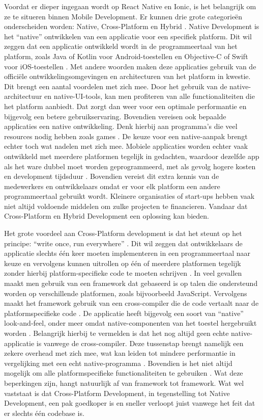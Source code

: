 Voordat er dieper ingegaan wordt op React Native en Ionic, is het belangrijk om ze te situeren binnen Mobile Development. Er kunnen drie grote categorieën onderscheiden worden: Native, Cross-Platform en Hybrid \autocite{Bron12}. Native Development is het ``native'' ontwikkelen van een applicatie voor een specifiek platform. Dit wil zeggen dat een applicatie ontwikkeld wordt in de programmeertaal van het platform, zoals Java of Kotlin voor Android-toestellen en Objective-C of Swift voor iOS-toestellen \autocite{Bron1, Bron11}. Met andere woorden maken deze applicaties gebruik van de officiële ontwikkelingsomgevingen en architecturen van het platform in kwestie. Dit brengt een aantal voordelen met zich mee. Door het gebruik van de native-architectuur en native-UI-tools, kan men profiteren van alle functionaliteiten die het platform aanbiedt. Dat zorgt dan weer voor een optimale performantie en bijgevolg een betere gebruikservaring. Bovendien vereisen ook bepaalde applicaties een native ontwikkeling. Denk hierbij aan programma's die veel resources nodig hebben zoals games \autocite{Bron12}. De keuze voor een native-aanpak brengt echter toch wat nadelen met zich mee. Mobiele applicaties worden echter vaak ontwikkeld met meerdere platformen tegelijk in gedachten, waardoor dezelfde app als het ware dubbel moet worden geprogrammeerd, met als gevolg hogere kosten en development tijdsduur \autocite{Bron12}. Bovendien vereist dit extra kennis van de medewerkers en ontwikkelaars omdat er voor elk platform een andere programmeertaal gebruikt wordt. Kleinere organisaties of start-ups hebben vaak niet altijd voldoende middelen om zulke projecten te financieren. Vandaar dat Cross-Platform en Hybrid Development een oplossing kan bieden.

Het grote voordeel aan Cross-Platform development is dat het steunt op het principe: ``write once, run everywhere'' \autocite{Bron12}. Dit wil zeggen dat ontwikkelaars de applicatie slechts één keer moeten implementeren in een programmeertaal naar keuze en vervolgens kunnen uitrollen op één of meerdere platformen tegelijk zonder hierbij platform-specifieke code te moeten schrijven \autocite{Bron12}. In veel gevallen maakt men gebruik van een framework dat gebaseerd is op talen die ondersteund worden op verschillende platformen, zoals bijvoorbeeld JavaScript. Vervolgens maakt het framework gebruik van een cross-compiler die de code vertaalt naar de platformspecifieke code \autocite{Bron1}. De applicatie heeft bijgevolg een soort van ``native'' look-and-feel, onder meer omdat native-componenten van het toestel hergebruikt worden \autocite{Bron2}. Belangrijk hierbij te vermelden is dat het nog altijd geen echte native-applicatie is vanwege de cross-compiler. Deze tussenstap brengt namelijk een zekere overhead met zich mee, wat kan leiden tot mindere performantie in vergelijking met een echt native-programma \autocite{Bron12}. Bovendien is het niet altijd mogelijk om alle platformspecifieke functionaliteiten te gebruiken \autocite{Bron12}. Wat deze beperkingen zijn, hangt natuurlijk af van framework tot framework. Wat wel vaststaat is dat Cross-Platform Development, in tegenstelling tot Native Development, een pak goedkoper is en sneller verloopt juist vanwege het feit dat er slechts één codebase is.

